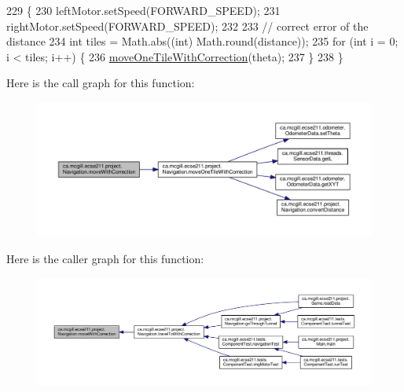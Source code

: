 \begin{DoxyCode}
229                                                                              \{
230     leftMotor.setSpeed(FORWARD\_SPEED);
231     rightMotor.setSpeed(FORWARD\_SPEED);
232 
233     \textcolor{comment}{// correct error of the distance}
234     \textcolor{keywordtype}{int} tiles = Math.abs((\textcolor{keywordtype}{int}) Math.round(distance));
235     \textcolor{keywordflow}{for} (\textcolor{keywordtype}{int} i = 0; i < tiles; i++) \{
236       \hyperlink{classca_1_1mcgill_1_1ecse211_1_1project_1_1_navigation_afbe677941e2bd44e35452e1eff508ae9}{moveOneTileWithCorrection}(theta);
237     \}
238   \}
\end{DoxyCode}
Here is the call graph for this function\+:\nopagebreak
\begin{figure}[H]
\begin{center}
\leavevmode
\includegraphics[width=350pt]{classca_1_1mcgill_1_1ecse211_1_1project_1_1_navigation_a48eeb9ae2da23664421e8da5642054c7_cgraph}
\end{center}
\end{figure}
Here is the caller graph for this function\+:\nopagebreak
\begin{figure}[H]
\begin{center}
\leavevmode
\includegraphics[width=350pt]{classca_1_1mcgill_1_1ecse211_1_1project_1_1_navigation_a48eeb9ae2da23664421e8da5642054c7_icgraph}
\end{center}
\end{figure}
\mbox{\label{classca_1_1mcgill_1_1ecse211_1_1project_1_1_navigation_a1a808e665b8dd5b8e79b0580724d239c}} 
